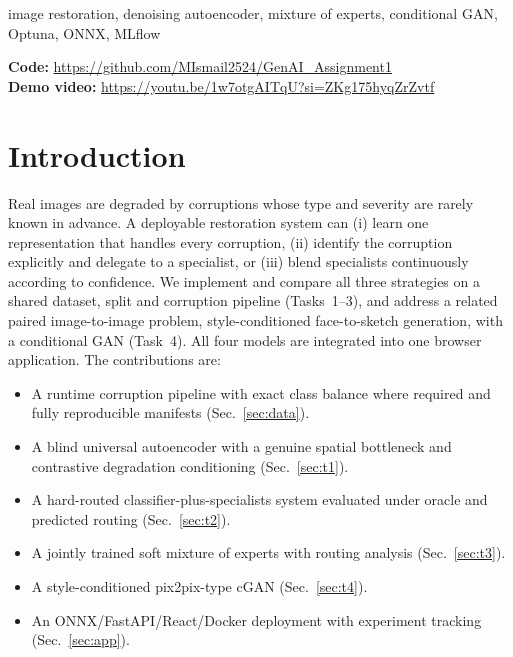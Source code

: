 \documentclass[conference]{IEEEtran}
\begin{document}
\begin{IEEEkeywords}
image restoration, denoising autoencoder, mixture of experts, conditional GAN, Optuna, ONNX, MLflow
\end{IEEEkeywords}

\noindent\textbf{Code:} \url{https://github.com/MIsmail2524/GenAI_Assignment1}\\
\textbf{Demo video:} \url{https://youtu.be/1w7otgAITqU?si=ZKg175hyqZrZvtf}

\section{Introduction}
Real images are degraded by corruptions whose type and severity are rarely known in advance. A deployable restoration system can (i) learn one representation that handles every corruption, (ii) identify the corruption explicitly and delegate to a specialist, or (iii) blend specialists continuously according to confidence. We implement and compare all three strategies on a shared dataset, split and corruption pipeline (Tasks~1--3), and address a related paired image-to-image problem, style-conditioned face-to-sketch generation, with a conditional GAN (Task~4). All four models are integrated into one browser application. The contributions are:
\begin{itemize}
\item A runtime corruption pipeline with exact class balance where required and fully reproducible manifests (Sec.~\ref{sec:data}).
\item A blind universal autoencoder with a genuine spatial bottleneck and contrastive degradation conditioning (Sec.~\ref{sec:t1}).
\item A hard-routed classifier-plus-specialists system evaluated under oracle and predicted routing (Sec.~\ref{sec:t2}).
\item A jointly trained soft mixture of experts with routing analysis (Sec.~\ref{sec:t3}).
\item A style-conditioned pix2pix-type cGAN (Sec.~\ref{sec:t4}).
\item An ONNX/FastAPI/React/Docker deployment with experiment tracking (Sec.~\ref{sec:app}).
\end{itemize}

\end{document}
